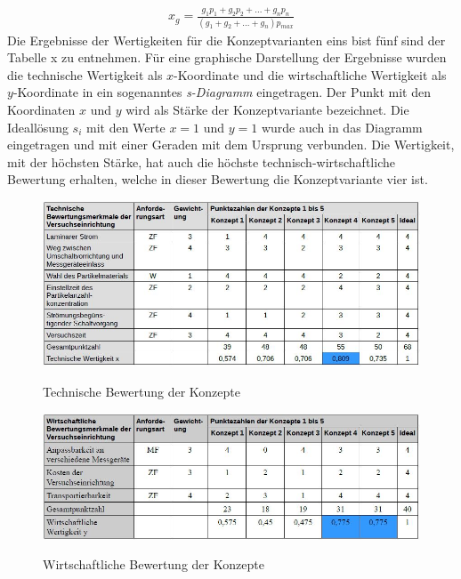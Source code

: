 \begin{align*}
	x_g = \frac{g_1p_1 + g_2p_2 + ... + g_np_n}{(g_1 + g_2 + ... + g_n)p_\textit{max}}
\end{align*}
Die Ergebnisse der Wertigkeiten f\"{u}r die Konzeptvarianten eins bist f\"{u}nf sind der Tabelle x zu entnehmen. F\"{u}r eine graphische Darstellung der Ergebnisse wurden die technische Wertigkeit als \(x\)-Koordinate und die wirtschaftliche Wertigkeit als \(y\)-Koordinate in ein sogenanntes \textit{s-Diagramm} eingetragen. Der Punkt mit den Koordinaten \(x\) und \(y\) wird als St\"{a}rke der Konzeptvariante bezeichnet. Die Ideall\"{o}sung \(s_i\) mit den Werte \(x = 1\) und \(y = 1\) wurde auch in das Diagramm eingetragen und mit einer Geraden mit dem Ursprung verbunden. Die Wertigkeit, mit der h\"{o}chsten St\"{a}rke, hat auch die h\"{o}chste technisch-wirtschaftliche Bewertung erhalten, welche in dieser Bewertung die Konzeptvariante vier ist.
\begin{figure}[H]
        \myfloatalign
        {\includegraphics[width=.8\linewidth]{gfx/TabEvalTwo.jpg}} \quad
        \caption[Technische Bewertung der Konzepte]
        {Technische Bewertung der Konzepte}
        \label{fig:TabEvalOne}
\end{figure}
\begin{figure}[H]
        \myfloatalign
        {\includegraphics[width=.8\linewidth]{gfx/TabEvalThree.jpg}} \quad
        \caption[Wirtschaftliche Bewertung der Konzepte]
        {Wirtschaftliche Bewertung der Konzepte}
        \label{fig:TabEvalOne}
\end{figure}